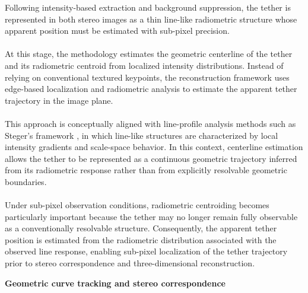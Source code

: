 Following intensity-based extraction and background suppression, the tether is represented in both stereo images as a thin line-like radiometric structure whose apparent position must be estimated with sub-pixel precision.
\\\\
At this stage, the methodology estimates the geometric centerline of the tether and its radiometric centroid from localized intensity distributions. Instead of relying on conventional textured keypoints, the reconstruction framework uses edge-based localization and radiometric analysis to estimate the apparent tether trajectory in the image plane.
\\\\
This approach is conceptually aligned with line-profile analysis methods such as Steger's framework \cite{steger2000subpixel}, in which line-like structures are characterized by local intensity gradients and scale-space behavior. In this context, centerline estimation allows the tether to be represented as a continuous geometric trajectory inferred from its radiometric response rather than from explicitly resolvable geometric boundaries.
\\\\
Under sub-pixel observation conditions, radiometric centroiding becomes particularly important because the tether may no longer remain fully observable as a conventionally resolvable structure. Consequently, the apparent tether position is estimated from the radiometric distribution associated with the observed line response, enabling sub-pixel localization of the tether trajectory prior to stereo correspondence and three-dimensional reconstruction.

\vspace{0.5cm}
\noindent \textbf{Geometric curve tracking and stereo correspondence}
\vspace{0.2cm}

